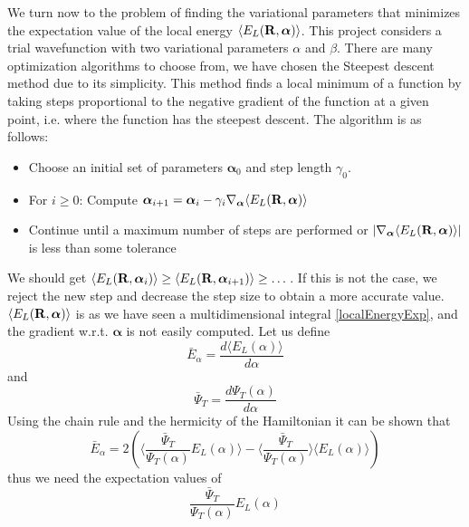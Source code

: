 \documentclass[english, a4paper]{article}
\begin{document}
We turn now to the problem of finding the variational parameters that minimizes the expectation value
of the local energy $\langle E_L({\bf R}, \boldsymbol{\alpha}) \rangle$. This project considers a trial wavefunction
with two variational parameters $\alpha$ and  $\beta$. 
There are many optimization algorithms to choose from, we have chosen the Steepest 
descent method due to its simplicity. This method finds a local minimum of a function by taking steps proportional 
to the negative gradient of the function at a given point, i.e. where the function has the steepest descent.
The algorithm is as follows:
\begin{itemize}
 \item Choose an initial set of parameters $\boldsymbol{\alpha}_0$ and step length $\gamma_0$.
 \item For $i \geq 0$: Compute $\boldsymbol{\alpha}_{i+1} = \boldsymbol{\alpha}_i - \gamma_i 
 \nabla_{\boldsymbol{\alpha}} \langle E_L({\bf R}, \boldsymbol{\alpha}) \rangle$
 \item Continue until a maximum number of steps are performed or 
 $|\nabla_{\boldsymbol{\alpha}} \langle E_L({\bf R}, \boldsymbol{\alpha}) \rangle|$ is
       less than some tolerance
\end{itemize}
We should get $\langle E_L({\bf R}, \boldsymbol{\alpha}_i) \rangle \geq \langle E_L({\bf R}, 
\boldsymbol{\alpha}_{i+1}) \rangle \geq \dots$.
If this is not the case, we reject the new step and decrease the step size to obtain a more
accurate value. 
$\langle E_L({\bf R}, \boldsymbol{\alpha}) \rangle$ is as we have seen a multidimensional integral \eqref{localEnergyExp}, 
and the gradient w.r.t. $\boldsymbol{\alpha}$
is not easily computed. Let us define
\begin{equation}
 \bar{E}_\alpha = \frac{d \langle E_L(\alpha) \rangle}{d\alpha}
\end{equation}
and 
\begin{equation}
 \bar{\Psi}_T = \frac{d \Psi_T(\alpha)}{d\alpha}
\end{equation}
Using the chain rule and the hermicity of the Hamiltonian it can be shown that
\begin{equation}
 \bar{E}_\alpha = 2 \left( \Bigr\langle \frac{\bar{\Psi}_T}{\Psi_T(\alpha)} E_L(\alpha) \Bigr\rangle 
 - \Bigr\langle \frac{\bar{\Psi}_T}{\Psi_T(\alpha)}\Bigr\rangle \langle E_L(\alpha) \rangle   \right)
 \label{localenergyalpha}
\end{equation}
thus we need the expectation values of
\begin{equation}
 \frac{\bar{\Psi}_T}{\Psi_T(\alpha)} E_L(\alpha)
 \label{waveenergy}
\end{equation}
\end{document}
